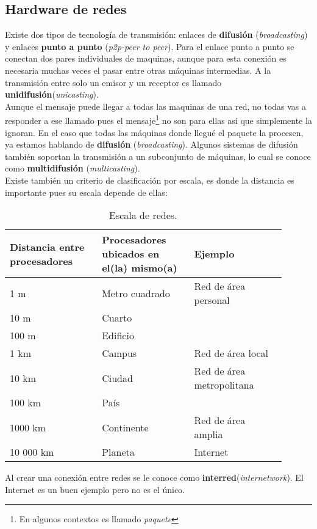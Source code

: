 \documentclass[
	12pt, %
	fleqn, %
	a4paper, %
	oneside, %
]{LegrandOrangeBook}
\begin{document}
\subsection{Hardware de redes}
Existe dos tipos de tecnología de transmisión: enlaces de \textbf{difusión} (\textit{broadcasting}) y enlaces \textbf{punto a punto} (\textit{p2p-peer to peer}). Para el enlace punto a punto se conectan dos pares individuales de maquinas, aunque para esta conexión es necesaria muchas veces el pasar entre otras máquinas intermedias. A la transmisión entre solo un emisor y un receptor es llamado \textbf{unidifusión}(\textit{unicasting}).\\
Aunque el mensaje puede llegar a todas las maquinas de una red, no todas vas a responder a ese llamado pues el mensaje\footnote{En algunos contextos es llamado \textit{paquete}} no son para ellas así que simplemente la ignoran. En el caso que todas las máquinas donde llegué el paquete la procesen, ya estamos hablando de \textbf{difusión} (\textit{broadcasting}). Algunos sistemas de difusión también soportan la transmisión a
un subconjunto de máquinas, lo cual se conoce como \textbf{multidifusión} (\textit{multicasting}).\\
Existe también un criterio de clasificación por escala, es donde la distancia es importante pues su escala depende de ellas:
\begin{table}[H]
\begin{tabular}{|m{0.3\linewidth}|m{0.3\linewidth}|m{0.3\linewidth}|}
\hline
\rowcolor[HTML]{9698ED} 
Distancia entre procesadores & Procesadores ubicados en el(la) mismo(a) & Ejemplo                              \\ \hline
1 m                          & Metro cuadrado                           & Red de área personal                 \\ \hline
10 m                         & Cuarto                                   &                                      \\ \cline{1-2}
100 m                        & Edificio                                 &                                      \\ \cline{1-2}
1 km                         & Campus                                   & \multirow{-3}{*}{Red de área local}  \\ \hline
10 km                        & Ciudad                                   & Red de área metropolitana            \\ \hline
100 km                       & País                                     &                                      \\ \cline{1-2}
1000 km                      & Continente                               & \multirow{-2}{*}{Red de área amplia} \\ \hline
10 000 km                    & Planeta                                  & Internet                             \\ \hline
\end{tabular}
\caption{Escala de redes.}
\end{table}
Al crear una conexión entre redes se le conoce como \textbf{interred}(\textit{internetwork}). El Internet es un buen ejemplo pero no es el único.
\end{document}
